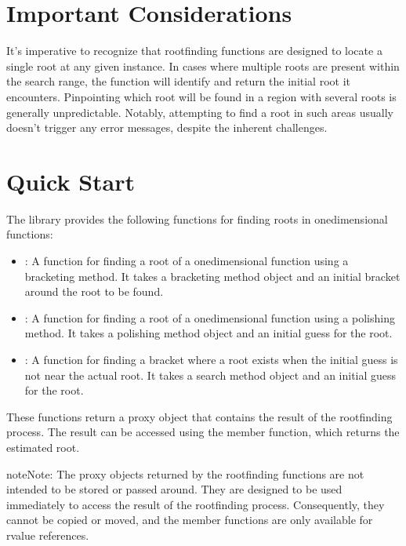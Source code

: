 \documentclass[letterpaper,10pt,english]{sphinxmanual}
\begin{document}
\section{Important Considerations}
\label{\detokenize{docRoots:important-considerations}}
\sphinxAtStartPar
It’s imperative to recognize that root\sphinxhyphen{}finding functions are designed to locate a single root at any given instance. In cases where multiple roots are present within the search range, the function will identify and return the initial root it encounters. Pinpointing which root will be found in a region with several roots is generally unpredictable. Notably, attempting to find a root in such areas usually doesn’t trigger any error messages, despite the inherent challenges.


\section{Quick Start}
\label{\detokenize{docRoots:quick-start}}
\sphinxAtStartPar
The library provides the following functions for finding roots in one\sphinxhyphen{}dimensional functions:
\begin{itemize}
\item {} 
\sphinxAtStartPar
{}: A function for finding a root of a one\sphinxhyphen{}dimensional function using a bracketing method. It takes a bracketing method object and an initial bracket around the root to be found.

\item {} 
\sphinxAtStartPar
{}: A function for finding a root of a one\sphinxhyphen{}dimensional function using a polishing method. It takes a polishing method object and an initial guess for the root.

\item {} 
\sphinxAtStartPar
{}: A function for finding a bracket where a root exists when the initial guess is not near the actual root. It takes a search method object and an initial guess for the root.

\end{itemize}

\sphinxAtStartPar
These functions return a proxy object that contains the result of the root\sphinxhyphen{}finding process. The result can be accessed using the  member function, which returns the estimated root.

\begin{sphinxadmonition}{note}{Note:}
\sphinxAtStartPar
The proxy objects returned by the root\sphinxhyphen{}finding functions are not intended to be stored or passed around. They are designed to be used immediately to access the result of the root\sphinxhyphen{}finding process. Consequently, they cannot be copied or moved, and the member functions are only available for r\sphinxhyphen{}value references.
\end{sphinxadmonition}
\end{document}

